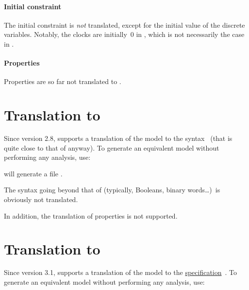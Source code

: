 \paragraph{Initial constraint}
The initial constraint is \emph{not} translated, except for the initial value of the discrete variables.
Notably, the clocks are initially~0 in \uppaal{}, which is not necessarily the case in \imitator{}.

\paragraph{Properties}
Properties are so far not translated to \uppaal{}.



\section{Translation to \hytech{}}\label{section:hytech}

Since version 2.8, \imitator{} supports a translation of the model to the \hytech{} syntax~\cite{HHW95} (that is quite close to that of \imitator{} anyway).
To generate an equivalent \hytech{} model without performing any analysis, use:


\imitator{} will generate a file .

The syntax going beyond that of \hytech{} (typically, Booleans, binary words…)\ is obviously not translated.

In addition, the translation of properties is not supported.


\section{Translation to \jani{}}\label{section:jani}

Since version 3.1, \imitator{} supports a translation of the model to the \href{https://jani-spec.org/}{\jani{} specification}~\cite{BDHHJT17}.
To generate an equivalent \jani{} model without performing any analysis, use:


